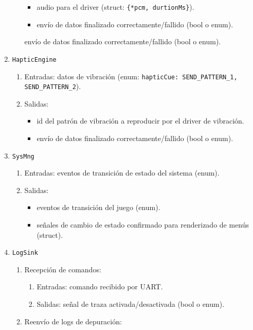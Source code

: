 \documentclass[11pt,a4paper]{article}
\begin{document}
\begin{enumerate}
\begin{enumerate}
      \begin{itemize}
        \item audio para el driver (struct: \texttt{\{*pcm, durtionMs\}}).
        \item envío de datos finalizado correctamente/fallido (bool o enum).
      \end{itemize}
      envío de datos finalizado correctamente/fallido (bool o enum).
    \end{enumerate}
  \item \texttt{HapticEngine}
    \begin{enumerate}
      \item Entradas: datos de vibración (enum: \texttt{hapticCue: SEND\_PATTERN\_1, SEND\_PATTERN\_2}).
      \item Salidas: 
      \begin{itemize}
        \item id del patrón de vibración a reproducir por el driver de vibración.
        \item envío de datos finalizado correctamente/fallido (bool o enum).
      \end{itemize}
    \end{enumerate}
  \item \texttt{SysMng}
    \begin{enumerate}
      \item Entradas: eventos de transición de estado del sistema (enum).
      \item Salidas: 
      \begin{itemize}
        \item eventos de transición del juego (enum).
        \item señales de cambio de estado confirmado para renderizado de menús (struct).
      \end{itemize}
    \end{enumerate}
  \item \texttt{LogSink}
    \begin{enumerate}
      \item Recepción de comandos:
      \begin{enumerate}
        \item Entradas: comando recibido por UART.
        \item Salidas: señal de traza activada/desactivada (bool o enum).
      \end{enumerate}
      \item Reenvío de logs de depuración:
      \begin{enumerate}

\end{enumerate}
\end{enumerate}
\end{enumerate}
\end{document}
